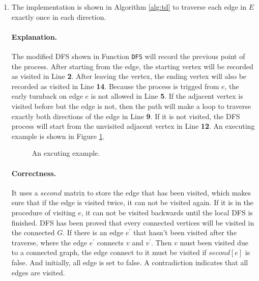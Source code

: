 \documentclass[12pt,a4paper]{article}
\makeatletter
\newtheorem*{solution}{Solution}
\theoremstyle{definition}
\renewenvironment{solution}[1][Solution] {\par\pushQED{\qed}\normalfont\topsep6\p@\@plus6\p@\relax\trivlist\item[\hskip\labelsep\bfseries#1\@addpunct{.}]\ignorespaces}{\popQED\endtrivlist\@endpefalse} \makeatother
\makeatother
\begin{document}
\begin{enumerate}
    \begin{solution}

        The implementation is shown in Algorithm \ref{alg:td} to traverse each edge in $E$ exactly once in each direction. 
        
        \paragraph{Explanation.} The modified DFS shown in Function \texttt{DFS} will record the previous point of the process. After starting from the edge, the starting vertex will be recorded as visited in Line \textbf{2}. After leaving the vertex, the ending vertex will also be recorded as visited in Line \textbf{14}. 
        Because the process is trigged from $e$, the early turnback on edge $e$ is not allowed in Line \textbf{5}.
        If the adjacent vertex is visited before but the edge is not, then the path will make a loop to traverse exactly both directions of the edge in Line \textbf{9}. If it is not visited, the DFS process will start from the unvisited adjacent vertex in Line \textbf{12}. An executing example is shown in Figure \ref{fig:exe}.
        
        \begin{figure}[h]
            \centering
            \subfigure[1]{}
            \subfigure[$\rightarrow$]{}
            \subfigure[$\rightarrow$]{}

            \subfigure[3$\rightarrow$]{}
            \subfigure[4$\rightarrow$3]{}
            \subfigure[$\rightarrow$2]{}
            \subfigure[$\rightarrow$1]{}
            \caption{An excuting example.}
            \label{fig:exe}
        \end{figure}
        
        \paragraph{Correctness.} It uses a $second$ matrix to store the edge that has been visited, which makes sure that if the edge is visited twice, it can not be visited again. If it is in the procedure of visiting $e$, it can not be visited backwards until the local DFS is finished. DFS has been proved that every connected vertices will be visited in the connected $G$. If there is an edge $e^\prime$ that hasn't been visited after the traverse, where the edge $e^\prime$ connects $v$ and $v^\prime$. Then $v$ must been visited due to a connected graph, the edge connect to it must be visited if $second[e]$ is false. And initially, all edge is set to false. A contradiction indicates that all edges are visited.
        

\end{solution}
\end{enumerate}
\end{document}
